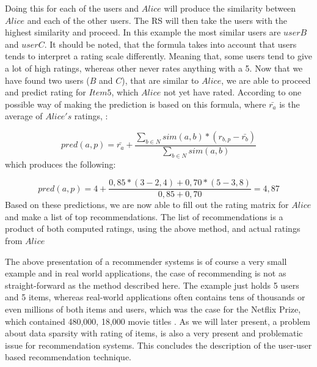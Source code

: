 Doing this for each of the users and \(Alice\) will produce the similarity between \(Alice\) and each of the other users. The RS will then take the users with the highest similarity and proceed. In this example the most similar users are \(userB\) and \(userC\). It should be noted, that the formula takes into account that users tends to interpret a rating scale differently. Meaning that, some users tend to give a lot of high ratings, whereas other never rates anything with a 5\citep[p. 15]{IntroductionRecommenderSystems}.\newline 
Now that we have found two users (\(B\) and \(C\)), that are similar to \(Alice\), we are able to proceed and predict rating for \(Item5\), which \(Alice\) not yet have rated. According to \citep[p. 16]{IntroductionRecommenderSystems} one possible way of making the prediction is based on this formula, where $\bar{r_{a}}$ is the average of \(Alice's\) ratings,  :\newline

\[
	pred(a,p) = \bar{r_{a}} + \frac{\sum_{b\in N} sim(a,b) * (r_{b,p} - \bar{r_{b}})}{\sum_{b\in N} sim(a,b)}
\]
which produces the following: \newline

\[
	pred(a,p) = 4 + \frac{0,85*(3-2,4)+0,70*(5-3,8)}{0,85+0,70} = 4,87
\]
Based on these predictions, we are now able to fill out the rating matrix for \(Alice\) and make a list of top recommendations. The list of recommendations is a product of both computed ratings, using the above method, and actual ratings from \(Alice\) \newline

The above presentation of a recommender systems is of course a very small example and in real world applications, the case of recommending is not as straight-forward as the method described here. The example just holds 5 users and 5 items, whereas real-world applications often contains tens of thousands or even millions of both items and users, which was the case for the Netflix Prize, which contained 480,000, 18,000 movie titles \citep{NetflixPrize}. As we will later present, a problem about data sparsity with rating of items, is also a very present and problematic issue for recommendation systems.\newline
This concludes the description of the user-user based recommendation technique.


